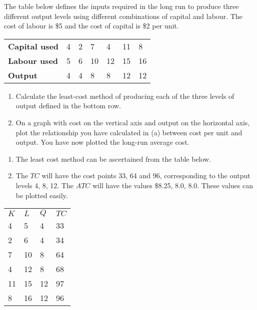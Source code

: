 \begin{enumialphparenastyle}
\begin{ex}\label{ex:ch8ex8}
The table below defines the inputs required in the long run to produce three different output levels using different combinations of capital and labour. The cost of labour is \$5 and the cost of capital is \$2 per unit.
\begin{center}
\begin{tabu} to \linewidth {|X[2,c]X[1,c]X[1,c]X[1,c]X[1,c]X[1,c]X[1,c]|}	\hline
{}	\textbf{Capital used}	&	4	&	2	&	7	&	4	&	11	&	8	\\
						\textbf{Labour used}	&	5	&	6	&	10	&	12	&	15	&	16	\\
	\textbf{Output}			&	4	&	4	&	8	&	8	&	12	&	12	\\	\hline
\end{tabu}
\end{center}
\begin{enumerate}
	\item	Calculate the least-cost method of producing each of the three levels of output defined in the bottom row.
	\item	On a graph with cost on the vertical axis and output on the horizontal axis, plot the relationship you have calculated in (a) between cost per unit and output. You have now plotted the long-run average cost.
\end{enumerate}
\begin{sol}
\begin{enumerate}
	\item	The least cost method can be ascertained from the table below.
	\item	The $TC$ will have the cost points 33, 64 and 96, corresponding to the output levels 4, 8, 12. The $ATC$ will have the values \$8.25,	8.0, 8.0. These values can be plotted easily.
\end{enumerate}
\begin{center}
	\begin{tabu} to \linewidth {|X[1,c]X[1,c]X[1,c]X[1,c]|}	\hline
		 $K$ & $L$ & $Q$ & $TC$ \\
		4	&	5	&	4	&	33	\\
		2	&	6	&	4	&	34	\\
		7	&	10	&	8	&	64	\\
		4	&	12	&	8	&	68	\\
		11	&	15	&	12	&	97	\\
		8	&	16	&	12	&	96 \\	\hline
	\end{tabu}
\end{center}
\end{sol}
\end{ex}


\end{enumialphparenastyle}
